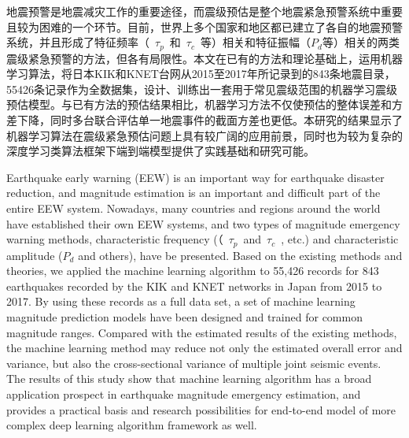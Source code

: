 
\begin{cabstract}
\indent 地震预警是地震减灾工作的重要途径，而震级预估是整个地震紧急预警系统中重要且较为困难的一个环节。目前，世界上多个国家和地区都已建立了各自的地震预警系统，并且形成了特征频率（~$\tau_{p}$~和~$\tau_{c}$~等）相关和特征振幅（$P_{d}$等）相关的两类震级紧急预警的方法，但各有局限性。本文在已有的方法和理论基础上，运用机器学习算法，将日本KIK和KNET台网从2015至2017年所记录到的843条地震目录，55426条记录作为全数据集，设计、训练出一套用于常见震级范围的机器学习震级预估模型。与已有方法的预估结果相比，机器学习方法不仅使预估的整体误差和方差下降，同时多台联合评估单一地震事件的截面方差也更低。本研究的结果显示了机器学习算法在震级紧急预估问题上具有较广阔的应用前景，同时也为较为复杂的深度学习类算法框架下端到端模型提供了实践基础和研究可能。
\end{cabstract}

\begin{eabstract}
\indent Earthquake early warning (EEW) is an important way for earthquake disaster reduction, and magnitude estimation is an important and difficult part of the entire EEW system. Nowadays, many countries and regions around the world have established their own EEW systems, and two types of magnitude emergency warning methods, characteristic frequency (（~$\tau_{p}$~and~$\tau_{c}$~, etc.) and characteristic amplitude ($P_{d}$ and others), have be presented. Based on the existing methods and theories, we applied the machine learning algorithm to 55,426 records for 843 earthquakes recorded by the KIK and KNET networks in Japan from 2015 to 2017. By using these records as a full data set, a set of machine learning magnitude prediction models have been designed and trained for common magnitude ranges. Compared with the estimated results of the existing methods, the machine learning method may reduce not only the estimated overall error and variance, but also the cross-sectional variance of multiple joint seismic events. The results of this study show that machine learning algorithm has a broad application prospect in earthquake magnitude emergency estimation, and provides a practical basis and research possibilities for end-to-end model of more complex deep learning algorithm framework as well.
\end{eabstract}


